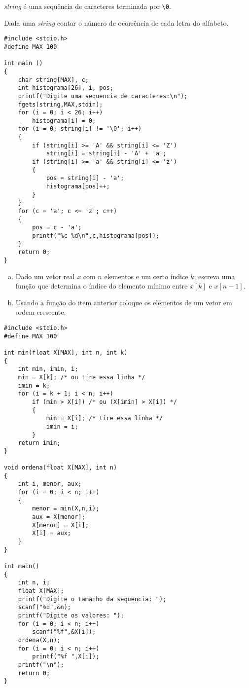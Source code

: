 \documentclass[a4paper]{memoir}
\begin{document}
\emph{string} é uma sequência de caracteres terminada por \verb|\0|.

\begin{prob}\label{prob315.c}
Dada uma \emph{string} contar o número de ocorrência de cada letra do alfabeto.
\end{prob}

\begin{sol}
\begin{lstlisting}
#include <stdio.h>
#define MAX 100

int main ()
{
    char string[MAX], c;
    int histograma[26], i, pos;
    printf("Digite uma sequencia de caracteres:\n");
    fgets(string,MAX,stdin);
    for (i = 0; i < 26; i++)
        histograma[i] = 0;
    for (i = 0; string[i] != '\0'; i++)
    {
        if (string[i] >= 'A' && string[i] <= 'Z')
            string[i] = string[i] - 'A' + 'a';
        if (string[i] >= 'a' && string[i] <= 'z')
        {
            pos = string[i] - 'a';
            histograma[pos]++;
        }
    }
    for (c = 'a'; c <= 'z'; c++)
    {
        pos = c - 'a';
        printf("%c %d\n",c,histograma[pos]);
    }
    return 0;
}
\end{lstlisting}
\end{sol}

\begin{prob}\label{prob316.c}
\begin{enumerate}[a)]
 \item Dado um vetor real $x$ com $n$ elementos e um certo índice $k$, escreva uma função que determina o índice do elemento mínimo entre $x[k]$ e $x[n-1]$.
 \item Usando a função do item anterior coloque os elementos de um vetor em ordem crescente.
\end{enumerate}

\end{prob}

\newpage

\begin{sol}
\begin{lstlisting}
#include <stdio.h>
#define MAX 100

int min(float X[MAX], int n, int k)
{
    int min, imin, i;
    min = X[k]; /* ou tire essa linha */
    imin = k;
    for (i = k + 1; i < n; i++)
        if (min > X[i]) /* ou (X[imin] > X[i]) */
        {
            min = X[i]; /* tire essa linha */
            imin = i;
        }
    return imin;
}

void ordena(float X[MAX], int n)
{
    int i, menor, aux;
    for (i = 0; i < n; i++)
    {
        menor = min(X,n,i);
        aux = X[menor];
        X[menor] = X[i];
        X[i] = aux;
    }
}

int main()
{
    int n, i;
    float X[MAX];
    printf("Digite o tamanho da sequencia: ");
    scanf("%d",&n);
    printf("Digite os valores: ");
    for (i = 0; i < n; i++)
        scanf("%f",&X[i]);
    ordena(X,n);
    for (i = 0; i < n; i++)
        printf("%f ",X[i]);
    printf("\n");
    return 0;
}
\end{lstlisting}
\end{sol}





% 
\end{document}
